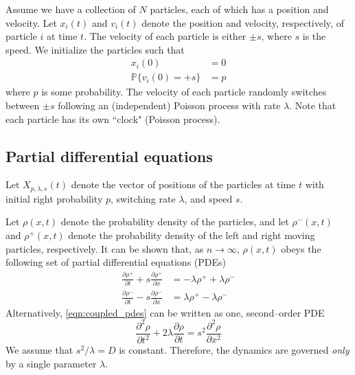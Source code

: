 \documentclass[prl,reprint]{revtex4-1}
\begin{document}
Assume we have a collection of $N$ particles, each of which has a position and velocity. 
%
Let $x_i(t)$ and $v_i(t)$ denote the position and velocity, respectively, of particle $i$ at time $t$.
%
The velocity of each particle is either $\pm s$, where $s$ is the speed. 
%
We initialize the particles such that
\begin{equation}
\begin{aligned}
x_i(0) & = 0 \\
\mathbb{P} \{ v_i(0) = +s \} & = p
\end{aligned}
\end{equation}
where $p$ is some probability.
%
The velocity of each particle randomly switches between $\pm s$ following an (independent) Poisson process with rate $\lambda$.
%
Note that each particle has its own ``clock" (Poisson process).

\subsection{Partial differential equations}

Let $X_{p, \lambda, s}(t)$ denote the vector of positions of the particles at time $t$ with initial right probability $p$, switching rate $\lambda$, and speed $s$.

Let $\rho(x, t)$ denote the probability density of the particles, and let $\rho^-(x, t)$ and $\rho^+(x, t)$ denote the probability density of the left and right moving particles, respectively.
%
It can be shown that, as $n \rightarrow \infty$, $\rho(x, t)$ obeys the following set of partial differential equations (PDEs)
\begin{equation} \label{eqn:coupled_pdes}
\begin{aligned}
\frac{\partial \rho^+}{\partial t} + s \frac{\partial \rho^+}{\partial x} & = -\lambda \rho^+ +\lambda \rho^- \\
\frac{\partial \rho^-}{\partial t} - s \frac{\partial \rho^-}{\partial x} & = \lambda \rho^+ -\lambda \rho^- 
\end{aligned}
\end{equation}
%
Alternatively, \eqref{eqn:coupled_pdes} can be written as one, second--order PDE
\begin{equation} \label{eq:second_order_pde}
\frac{\partial^2 \rho}{\partial t^2} + 2 \lambda \frac{\partial \rho}{\partial t} = s^2 \frac{\partial ^2 \rho}{\partial x^2}
\end{equation}
%
We assume that $s^2/\lambda = D$ is constant.
%
Therefore, the dynamics are governed {\em only} by a single parameter $\lambda$.
\end{document}

